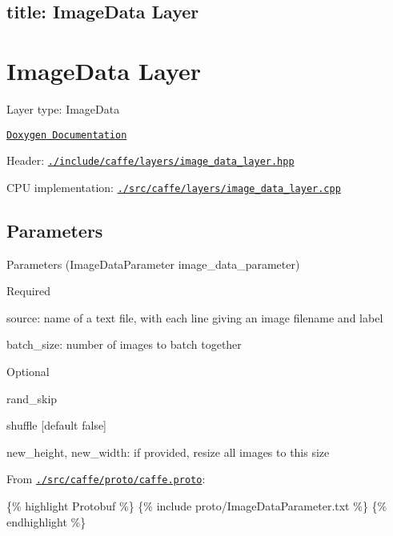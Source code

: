 

 \subsection*{title\+: Image\+Data Layer }

\section*{Image\+Data Layer}


\begin{DoxyItemize}
\item Layer type\+: {\ttfamily Image\+Data}
\item \href{http://caffe.berkeleyvision.org/doxygen/classcaffe_1_1ImageDataLayer.html}{\tt Doxygen Documentation}
\item Header\+: \href{https://github.com/BVLC/caffe/blob/master/include/caffe/layers/image_data_layer.hpp}{\tt {\ttfamily ./include/caffe/layers/image\+\_\+data\+\_\+layer.hpp}}
\item C\+PU implementation\+: \href{https://github.com/BVLC/caffe/blob/master/src/caffe/layers/image_data_layer.cpp}{\tt {\ttfamily ./src/caffe/layers/image\+\_\+data\+\_\+layer.cpp}}
\end{DoxyItemize}

\subsection*{Parameters}


\begin{DoxyItemize}
\item Parameters ({\ttfamily Image\+Data\+Parameter image\+\_\+data\+\_\+parameter})
\begin{DoxyItemize}
\item Required
\begin{DoxyItemize}
\item {\ttfamily source}\+: name of a text file, with each line giving an image filename and label
\item {\ttfamily batch\+\_\+size}\+: number of images to batch together
\end{DoxyItemize}
\item Optional
\begin{DoxyItemize}
\item {\ttfamily rand\+\_\+skip}
\item {\ttfamily shuffle} \mbox{[}default false\mbox{]}
\item {\ttfamily new\+\_\+height}, {\ttfamily new\+\_\+width}\+: if provided, resize all images to this size
\end{DoxyItemize}
\end{DoxyItemize}
\item From \href{https://github.com/BVLC/caffe/blob/master/src/caffe/proto/caffe.proto}{\tt {\ttfamily ./src/caffe/proto/caffe.proto}}\+:
\end{DoxyItemize}

\{\% highlight Protobuf \%\} \{\% include proto/\+Image\+Data\+Parameter.\+txt \%\} \{\% endhighlight \%\} 